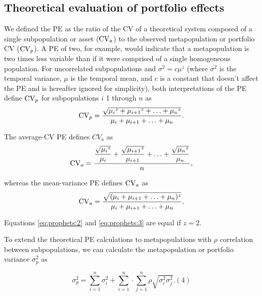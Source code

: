 \subsection{Theoretical evaluation of portfolio effects}

We defined the PE as the ratio of the CV of a theoretical system composed of a
single subpopulation or asset ($\mathrm{CV}_a$) to the observed metapopulation or
portfolio CV ($\mathrm{CV}_p$). A PE of two, for example, would indicate that a
metapopulation is two times less variable than if it were comprised of a single
homogeneous population. For uncorrelated subpopulations and $\sigma^2 = c
\mu^z$ (where $\sigma^2$ is the temporal variance, $\mu$ is the temporal mean,
and $c$ is a constant that doesn't affect the PE and is hereafter ignored for
simplicity), both interpretations of the PE define $\mathrm{CV}_p$ for subpopulations
$i$ 1 through $n$ as
\begin{equation}
\mathrm{CV}_p = \dfrac{\sqrt{{\mu_i}^z + {\mu_{i+1}}^z + \ldots + {\mu_n}^z}}{\mu_i +
\mu_{i+1} + \ldots + \mu_n}.
\label{eq:prophets:1}
\end{equation}

\noindent The average-CV PE defines $CV_a$ as
\begin{equation}
\mathrm{CV}_a = \dfrac{\dfrac{\sqrt{{\mu_i}^z}}{\mu_i} +
\dfrac{\sqrt{{\mu_{i+1}}^z}}{\mu_{i+1}} + \ldots +
\dfrac{\sqrt{{\mu_n}^z}}{\mu_n}}{n},
\label{eq:prophets:2}
\end{equation}

\noindent whereas the mean-variance PE defines $\mathrm{CV}_a$ as
\begin{equation}
\mathrm{CV}_a = \dfrac{\sqrt{(\mu_i + \mu_{i+1} + \ldots + \mu_n)^z}}{\mu_i +
\mu_{i+1} + \ldots + \mu_n}.
\label{eq:prophets:3}
\end{equation}

\noindent Equations \ref{eq:prophets:2} and \ref{eq:prophets:3} are equal if $z = 2$.

To extend the theoretical PE calculations to metapopulations with $\rho$
correlation between subpopulations, we can calculate the metapopulation or
portfolio variance $\sigma^2_p$ as

\begin{equation}
 \sigma^2_p = \sum_{i =1}^n \sigma^2_i + \sum_{i =1}^n \cdot \sum_{j =1}^n \rho \sqrt{\sigma^2_i \sigma^2_j}. (4)
\end{equation}

